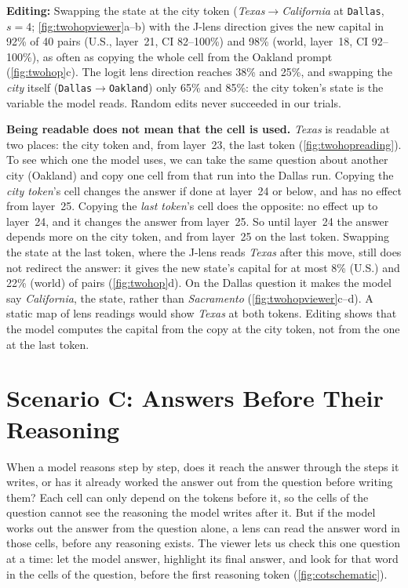 \documentclass{vgtc}       %
\newcommand{\LL}{logit lens}
\newcommand{\JL}{J-lens}
\begin{document}
\textbf{Editing:} Swapping the state at the city token (\emph{Texas}$\to$\emph{California} at \texttt{Dallas},
$s=4$; \cref{fig:twohopviewer}a--b) with the \JL{} direction gives the new capital in 92\% of 40 pairs (U.S.,
layer~21, CI 82--100\%) and 98\% (world, layer~18, CI 92--100\%), as often as copying the whole cell from the Oakland
prompt (\cref{fig:twohop}c). The \LL{} direction reaches 38\% and 25\%, and swapping the \emph{city} itself
(\texttt{Dallas}$\to$\texttt{Oakland}) only 65\% and 85\%: the city token's state is the variable the model reads.
Random edits never succeeded in our trials.

\textbf{Being readable does not mean that the cell is used.} \emph{Texas} is readable at two places: the city token and, from
layer~23, the last token (\cref{fig:twohopreading}). To see which one the model uses, we can take the same question
about another city (Oakland) and copy one cell from that run into the Dallas run. Copying the \emph{city token}'s
cell changes the answer if done at layer~24 or below, and has no effect from layer~25. Copying the \emph{last
token}'s cell does the opposite: no effect up to layer~24, and it changes the answer from layer~25. So until
layer~24 the answer depends more on the city token, and from layer~25 on the last token. Swapping the state at the last token, where the \JL{} reads \emph{Texas} after this move,
still does not redirect the answer: it gives the new state's capital for at most 8\% (U.S.) and 22\% (world) of
pairs (\cref{fig:twohop}d). On the Dallas question it makes the model say \emph{California}, the state, rather than
\emph{Sacramento} (\cref{fig:twohopviewer}c--d). A static map of lens readings would show \emph{Texas} at both
tokens. Editing shows that the model computes the capital from the copy at the city token, not from the one at the last token.

\section{Scenario C: Answers Before Their Reasoning}
\label{sec:cot}

When a model reasons step by step, does it reach the answer through the steps it writes, or has it already worked
the answer out from the question before writing them? Each cell can only depend on the tokens before it, so the cells
of the question cannot see the reasoning the model writes after it. But if the model works out the answer from the
question alone, a lens can read the answer word in those cells, before any reasoning exists. The viewer lets us check
this one question at a time: let the model answer, highlight its final answer, and look for that word in the cells of
the question, before the first reasoning token (\cref{fig:cotschematic}).
\end{document}
